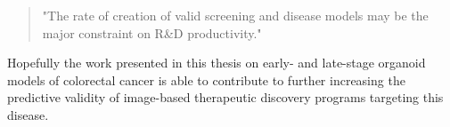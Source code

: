 \begin{flushleft}
\begin{quote}
"The rate of creation of valid screening and disease models may be the major constraint on R\&D productivity."
\end{quote}

Hopefully the work presented in this thesis on early- and late-stage organoid models of colorectal cancer is able to contribute to further increasing the predictive validity of image-based therapeutic discovery programs targeting this disease. 
\end{flushleft}